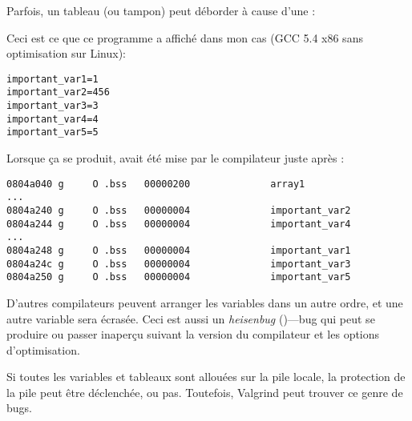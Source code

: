 
Parfois, un tableau (ou tampon) peut déborder à cause d'une :



Ceci est ce que ce programme a affiché dans mon cas (GCC 5.4 x86 sans optimisation sur Linux):

\begin{lstlisting}
important_var1=1
important_var2=456
important_var3=3
important_var4=4
important_var5=5
\end{lstlisting}

Lorsque ça se produit,  avait été mise par le compilateur juste
après :

\begin{lstlisting}[caption=objdump -x]
0804a040 g     O .bss   00000200              array1
...
0804a240 g     O .bss   00000004              important_var2
0804a244 g     O .bss   00000004              important_var4
...
0804a248 g     O .bss   00000004              important_var1
0804a24c g     O .bss   00000004              important_var3
0804a250 g     O .bss   00000004              important_var5
\end{lstlisting}

D'autres compilateurs peuvent arranger les variables dans un autre ordre, et une autre
variable sera écrasée.
Ceci est aussi un \textit{heisenbug} ()---bug qui peut se produire
ou passer inaperçu suivant la version du compilateur et les options d'optimisation.

Si toutes les variables et tableaux sont allouées sur la pile locale, la protection
de la pile peut être déclenchée, ou pas.
Toutefois, Valgrind peut trouver ce genre de bugs.

